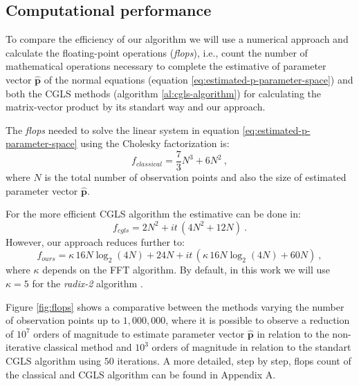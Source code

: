 \subsection{Computational performance}

To compare the efficiency of our algorithm we will use a numerical approach and calculate the floating-point operations (\emph{flops}), i.e., count the number of mathematical operations necessary to complete the estimative of parameter vector $\mathbf{\hat{p}}$ of the normal equations (equation \ref{eq:estimated-p-parameter-space}) and both the CGLS methods (algorithm \ref{al:cgls-algorithm}) for calculating the matrix-vector product by its standart way and our approach.

The \emph{flops} needed to solve the linear system in equation \ref{eq:estimated-p-parameter-space} using the Cholesky factorization is:
\begin{equation}
f_{classical} =  \dfrac{7}{3} N^{3} + 6 N^{2}\: ,
\label{eq:flops-normal-cholesky}
\end{equation}
where $N$ is the total number of observation points and also the size of estimated parameter vector $\mathbf{\hat{p}}$.

For the more efficient CGLS algorithm the estimative can be done in:
\begin{equation}
f_{cgls} =  2 N^{2} + it \, (4 N^{2} + 12 N) \: .
\label{eq:flops-cgls}
\end{equation}
However, our approach reduces further to:
\begin{equation}
f_{ours} =  \kappa  \, 16 N \log_2(4 N) + 24 N + it \, (\kappa  \, 16 N \log_2 (4 N) + 60 N) \: ,
\label{eq:flops-cgls-bccb}
\end{equation}
where $\kappa$ depends on the FFT algorithm. By default, in this work we will use $\kappa = 5$ for the \emph{radix-2} algorithm \citep{vanloan1992}.

Figure \ref{fig:flops} shows a comparative between the methods varying the number of observation points up to $1,000,000$, where it is possible to observe a reduction of $10^7$ orders of magnitude to estimate parameter vector $\mathbf{\hat{p}}$ in relation to the non-iterative classical method and $10^3$ orders of magnitude in relation to the standart CGLS algorithm using $50$ iterations. A more detailed, step by step, flops count of the classical and CGLS algorithm can be found in Appendix A.

